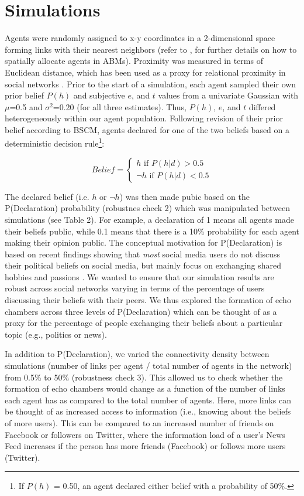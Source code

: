 \documentclass[doc,floatsintext]{apa6}
\begin{document}
\section{Simulations}
Agents were randomly assigned to x-y coordinates in a 2-dimensional space forming links with their nearest neighbors (refer to \cite{wilensky2015introduction, macal2005tutorial}, for further details on how to spatially allocate agents in ABMs). Proximity was measured in terms of Euclidean distance, which has been used as a proxy for relational proximity in social networks \citep{duggins2017}. Prior to the start of a simulation, each agent sampled their own prior belief \(P(h)\) and subjective \(e\), and \(t\) values from a univariate Gaussian with \(\mu\)=0.5 and \(\sigma^2\)=0.20 (for all three estimates). Thus, \(P(h)\), \(e\), and \(t\) differed heterogeneously within our agent population. Following revision of their prior belief according to BSCM, agents declared for one of the two beliefs based on a deterministic decision rule\footnote{If \(P(h)\) = 0.50, an agent declared either belief with a probability of 50\%.}: 

\[
Belief = \begin{cases}
h \text{ if } P(h|d) > 0.5 \\
\neg h \text{ if } P(h|d) < 0.5 
\end{cases}
\]

The declared belief (i.e. \(h\) or \(\neg h\))  was then made pubic based on the P(Declaration) probability (robustnes check 2) which was manipulated between simulations (see Table 2). For example, a declaration of 1 means all agents made their beliefs public, while 0.1 means that there is a 10\% probability for each agent making their opinion public. The conceptual motivation for P(Declaration) is based on recent findings showing that \emph{most} social media users do not discuss their political beliefs on social media, but mainly focus on exchanging shared hobbies and passions \citep{newman2019reuters}. We wanted to ensure that our simulation results are robust across social networks varying in terms of the percentage of users discussing their beliefs with their peers. We thus explored the formation of echo chambers across three levels of P(Declaration) which can be thought of as a proxy for the percentage of people exchanging their beliefs about a particular topic (e.g., politics or news). 

In addition to P(Declaration), we varied the connectivity density between simulations (number of links per agent / total number of agents in the network) from 0.5\% to 50\% (robustness check 3). This allowed us to check whether the formation of echo chambers would change as a function of the number of links each agent has as compared to the total number of agents. Here, more links can be thought of as increased access to information (i.e., knowing about the beliefs of more users). This can be compared to an increased number of friends on Facebook or followers on Twitter, where the information load of a user's News Feed increases if the person has more friends (Facebook) or follows more users (Twitter). 
\end{document}
